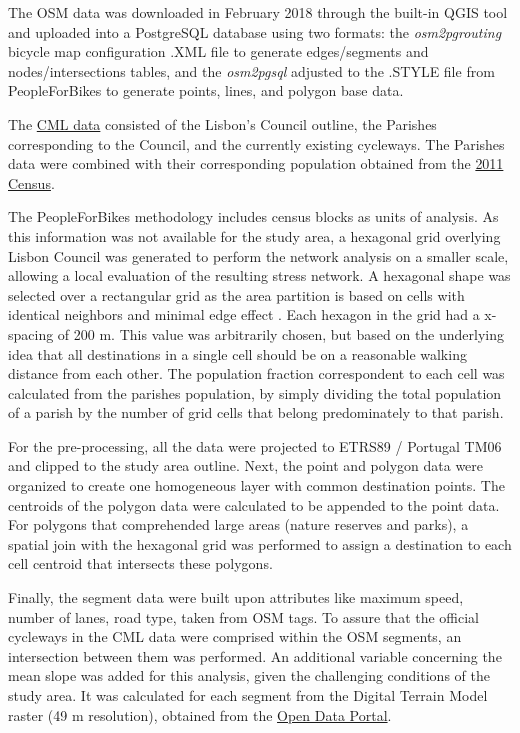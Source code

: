 \documentclass[information,article,submit,moreauthors,pdftex,10pt,a4paper]{mdpi}
\theoremstyle{mdpi}
\newcounter{ex}
\newcounter{re}
\theoremstyle{mdpidefinition}
\begin{document}
The OSM data was downloaded in February 2018 through the built-in QGIS tool and uploaded into a PostgreSQL database using two formats: the \textit{osm2pgrouting} bicycle map
configuration .XML file to generate edges/segments and nodes/intersections tables, and the \textit{osm2pgsql} adjusted to the .STYLE file from PeopleForBikes to generate points, lines, and polygon base data. 

The \href{http://geodados.cm-lisboa.pt/}{CML data} consisted of the Lisbon's Council outline, the Parishes corresponding to the Council, and the currently existing cycleways. The Parishes data were combined with their corresponding population obtained from the \href{http://censos.ine.pt/}{2011 Census}. 

The PeopleForBikes methodology includes census blocks as units of analysis. As this information was not available for the study area, a hexagonal grid overlying Lisbon Council was generated to perform the network analysis on a smaller scale, allowing a local evaluation of the resulting stress network. A hexagonal shape was selected over a rectangular grid as the area partition is based on cells with identical neighbors and minimal edge effect \cite{Strimas-Mackey2016}. Each hexagon in the grid had a x-spacing of 200 m. This value was arbitrarily chosen, but based on the underlying idea that all destinations in a single cell should be on a reasonable walking distance from each other. The population fraction correspondent to each cell was calculated from the parishes population, by simply dividing the total population of a parish by the number of grid cells that belong predominately to that parish.

For the pre-processing, all the data were projected to ETRS89 / Portugal TM06 and clipped to the study area outline. Next, the point and polygon data were organized to create one homogeneous layer with common destination points. The centroids of the polygon data were calculated to be appended to the point data. For polygons that comprehended large areas (nature reserves and parks), a spatial join with the hexagonal grid was performed to assign a destination to each cell centroid that intersects these polygons.

Finally, the segment data were built upon attributes like maximum speed, number of lanes, road type, taken from OSM tags. To assure that the official cycleways in the CML data were comprised within the OSM segments, an intersection between them was performed. An additional variable concerning the mean slope was added for this analysis, given the challenging conditions of the study area. It was calculated for each segment from the Digital Terrain Model raster (49 m resolution), obtained from the \href{http://dados.cm-lisboa.pt}{Open Data Portal}. 
\end{document}
